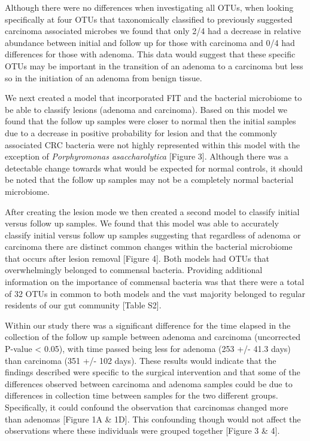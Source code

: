 \documentclass[12pt,]{article}
\begin{document}
Although there were no differences when investigating all OTUs, when
looking specifically at four OTUs that taxonomically classified to
previously suggested carcinoma associated microbes we found that only
2/4 had a decrease in relative abundance between initial and follow up
for those with carcinoma and 0/4 had differences for those with adenoma.
This data would suggest that these specific OTUs may be important in the
transition of an adenoma to a carcinoma but less so in the initiation of
an adenoma from benign tissue.

We next created a model that incorporated FIT and the bacterial
microbiome to be able to classify lesions (adenoma and carcinoma). Based
on this model we found that the follow up samples were closer to normal
then the initial samples due to a decrease in positive probability for
lesion and that the commonly associated CRC bacteria were not highly
represented within this model with the exception of \emph{Porphyromonas
asaccharolytica} {[}Figure 3{]}. Although there was a detectable change
towards what would be expected for normal controls, it should be noted
that the follow up samples may not be a completely normal bacterial
microbiome.

After creating the lesion mode we then created a second model to
classify initial versus follow up samples. We found that this model was
able to accurately classify initial versus follow up samples suggesting
that regardless of adenoma or carcinoma there are distinct common
changes within the bacterial microbiome that occurs after lesion removal
{[}Figure 4{]}. Both models had OTUs that overwhelmingly belonged to
commensal bacteria. Providing additional information on the importance
of commensal bacteria was that there were a total of 32 OTUs in common
to both models and the vast majority belonged to regular residents of
our gut community {[}Table S2{]}.

Within our study there was a significant difference for the time elapsed
in the collection of the follow up sample between adenoma and carcinoma
(uncorrected P-value \textless{} 0.05), with time passed being less for
adenoma (253 +/- 41.3 days) than carcinoma (351 +/- 102 days). These
results would indicate that the findings described were specific to the
surgical intervention and that some of the differences observed between
carcinoma and adenoma samples could be due to differences in collection
time between samples for the two different groups. Specifically, it
could confound the observation that carcinomas changed more than
adenomas {[}Figure 1A \& 1D{]}. This confounding though would not affect
the observations where these individuals were grouped together {[}Figure
3 \& 4{]}.
\end{document}

